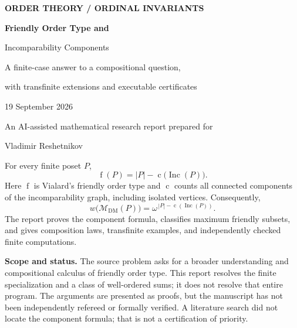 \documentclass[11pt,letterpaper]{article}
\theoremstyle{definition}
\theoremstyle{remark}
\newcommand{\fot}{\operatorname{f}}
\newcommand{\Inc}{\operatorname{Inc}}
\newcommand{\cc}{\operatorname{c}}
\newcommand{\DM}{\mathrm{DM}}
\newcommand{\M}{\mathcal M}
\begin{document}
\begin{titlepage}
\vspace*{0.5in}
{\small\sffamily\bfseries\color{Accent}ORDER THEORY \; / \; ORDINAL INVARIANTS}\par
\vspace{0.3in}
{\Huge\bfseries\color{Ink}Friendly Order Type and\par
Incomparability Components}\par
\vspace{0.22in}
{\Large A finite-case answer to a compositional question,\par
with transfinite extensions and executable certificates}\par
\vspace{0.35in}
{\large 19 September 2026}\par
\vspace{0.15in}
{\color{Muted}An AI-assisted mathematical research report prepared for\par
Vladimir Reshetnikov}\par
\vspace{0.35in}
\begin{resultbox}
For every finite poset $P$,
\[
\boxed{\fot(P)=|P|-\cc\bigl(\Inc(P)\bigr).}
\]
Here $\fot$ is Vialard's friendly order type and $\cc$ counts all connected
components of the incomparability graph, including isolated vertices.
Consequently,
\[
\boxed{w\bigl(\M_{\DM}(P)\bigr)=\omega^{\,|P|-\cc(\Inc(P))}.}
\]
The report proves the component formula, classifies maximum friendly subsets,
and gives composition laws, transfinite examples, and independently checked
finite computations.
\end{resultbox}
\vfill
\noindent\textbf{Scope and status.}
The source problem asks for a broader understanding and compositional
calculus of friendly order type. This report resolves the finite specialization
and a class of well-ordered sums; it does not resolve that entire program.
The arguments are presented as proofs, but the manuscript has not been
independently refereed or formally verified. A literature search did not locate
the component formula; that is not a certification of priority.
\end{titlepage}
\end{document}
